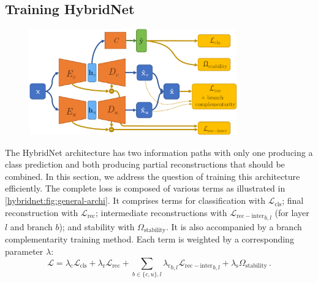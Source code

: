 \subsection{Training HybridNet}
\label{hybridnet:sec:training}

\begin{figure}[t]
	\centering
	\includegraphics[width=0.8\textwidth]{images/hybridnet_losses}
    \label{hybridnet:fig:general-archi}
\end{figure}


The HybridNet architecture has two information paths with only one producing a class prediction and both producing partial reconstructions that should be combined. In this section, we address the question of training this architecture efficiently. The complete loss is composed of various terms as illustrated in \autoref{hybridnet:fig:general-archi}. It comprises terms for classification with $\mathcal L_\mathrm{cls}$; final reconstruction with ${\mathcal L_\mathrm{rec}}$; intermediate reconstructions with ${\mathcal L_\mathrm{rec-inter}}_{b,l}$ (for layer $l$ and branch $b$); and stability with $\Omega_\mathrm{stability}$. It is also accompanied by a branch complementarity training method. Each term is weighted by a corresponding parameter $\lambda$:
\begin{equation}\textstyle
	\mathcal L = \lambda_\mathrm{c} \mathcal L_\mathrm{cls} + \lambda_\mathrm{r} \mathcal L_\mathrm{rec} + \sum_{b\in \{c,u\},l} {\lambda_\mathrm{r}}_{b,l} {\mathcal L_\mathrm{rec-inter}}_{b,l} + \lambda_\mathrm{s} \Omega_\mathrm{stability} \,.
    \label{hybridnet:eq:full-loss}
\end{equation}

